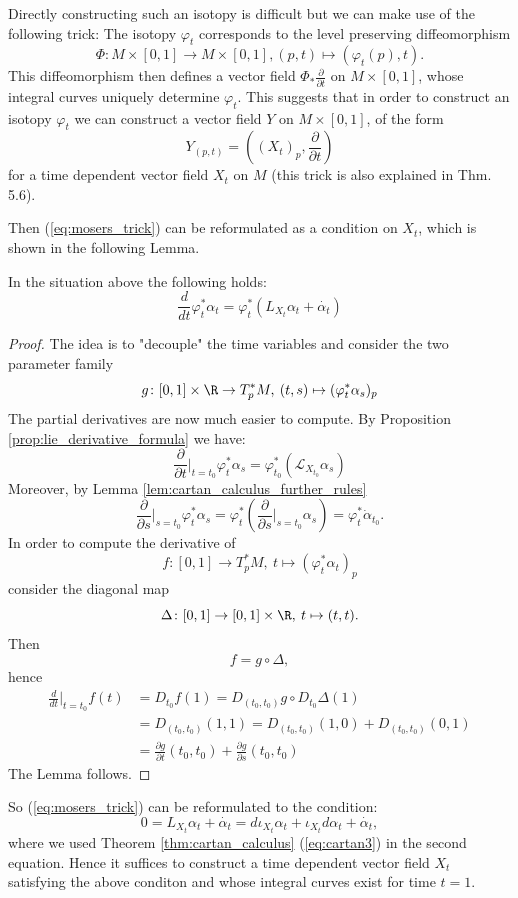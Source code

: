 Directly constructing such an isotopy is difficult but we can make use of the following trick: The isotopy $\varphi_t$ corresponds to the level preserving diffeomorphism
\[
\Phi \colon M \times [0,1] \to M \times [0,1], (p,t) \mapsto (\varphi_t(p),t).
\]
This diffeomorphism then defines a vector field $\Phi_\ast \frac{\partial}{\partial t}$ on $M \times [0,1]$, whose integral curves uniquely determine $\varphi_t$. This suggests that in order to construct an isotopy $\varphi_t$ we can construct a vector field $Y$ on $M \times [0,1]$, of the form 
\[
Y_{(p,t)} = ((X_t)_p, \frac{\partial}{\partial t}) 
\]
for a time dependent vector field $X_t$ on $M$ (this trick is also explained in \cite{Milnor1965hcobord} Thm. 5.6). 

Then (\ref{eq:mosers_trick}) can be reformulated as a condition on $X_t$, which is shown in the following Lemma.

\begin{lemma}
    \label{lem:mosers_trick_lemma}
    In the situation above the following holds:
    \[
    \frac{d}{dt} \varphi_t^\ast \alpha_t = \varphi_t^\ast(L_{X_t}\alpha_t + \dot{\alpha_t})
    \]
\end{lemma}

\begin{proof}
    The idea is to "decouple" the time variables and consider the two parameter family
    \[
        g \colon [0,1] \times \R \to T_p^\ast M, \: (t,s) \mapsto (\varphi_t^\ast \alpha_s)_p
    \]
    The partial derivatives are now much easier to compute. By Proposition \ref{prop:lie_derivative_formula} we have:
    \[
    \frac{\partial}{\partial t}\bigg|_{t=t_0} \varphi_t^\ast \alpha_s = \varphi_{t_0}^\ast(\mathcal{L}_{X_{t_0}} \alpha_s)
    \]
    Moreover, by Lemma \ref{lem:cartan_calculus_further_rules}
    \[
        \frac{\partial}{\partial s}\bigg|_{s=t_0} \varphi_t^\ast \alpha_s = \varphi_t^\ast \left(\frac{\partial}{\partial s}\bigg|_{s=t_0}  \alpha_s \right) = \varphi_t^\ast \dot{\alpha}_{t_0}.
    \]
    In order to compute the derivative of 
    \[
    f \colon [0,1] \to T_p^\ast M, \: t \mapsto (\varphi_t^\ast \alpha_t)_p
    \]
    consider the diagonal map
    \[
    \Delta \colon [0,1] \to [0,1] \times \R, \: t \mapsto (t,t).
    \]
    Then
    \[
    f = g \circ\Delta,
    \]
    hence
    \begin{align*}
        \frac{d}{dt} \bigg|_{t = t_0} f(t) & = D_{t_0}f(1) = D_{(t_0,t_0)}g \circ D_{t_0}\Delta (1) \\
        & = D_{(t_0,t_0)}(1,1) = D_{(t_0,t_0)}(1,0) + D_{(t_0,t_0)}(0,1) \\
        & = \frac{\partial g}{\partial t} (t_0,t_0) + \frac{\partial g}{\partial s} (t_0,t_0)  
    \end{align*}
    The Lemma follows.
\end{proof}
So (\ref{eq:mosers_trick}) can be reformulated to the condition:
\[
    0 = L_{X_t}\alpha_t + \dot{\alpha_t} = d\iota_{X_t}\alpha_t + \iota_{X_t}d\alpha_t + \dot{\alpha_t},
\]
where we used Theorem \ref{thm:cartan_calculus} (\ref{eq:cartan3}) in the second equation. Hence it suffices to construct a time dependent vector field $X_t$ satisfying the above conditon and whose integral curves exist for time $t = 1$. 

